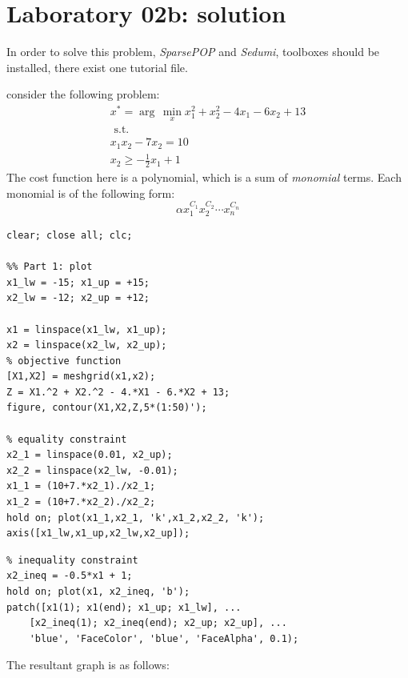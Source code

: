 \chapter{Laboratory 02b: solution}
\begin{QandAbox}
In order to solve this problem, \textit{SparsePOP} and \textit{Sedumi}, toolboxes should be installed, there exist one tutorial file.
\end{QandAbox}
consider the following problem:
\[
\begin{array}{c}
x^* = \arg\,\min\limits_{x} x_1^2 + x_2^2 - 4x_1 - 6x_2 + 13\\
\text{ s.t. }\\[1em]
x_1x_2 - 7x_2 = 10\\ [1em]
x_2 \geq -\frac{1}{2}x_1 +1
\end{array}
\]
The cost function here is a polynomial, which is a sum of \textit{monomial} terms. Each monomial is of the following form:
\[
\alpha x_1^{C_1} x_2^{C_2} \cdots x_n^{C_n}
\]

\begin{example}
\begin{lstlisting}
clear; close all; clc;

%% Part 1: plot
x1_lw = -15; x1_up = +15;
x2_lw = -12; x2_up = +12;

x1 = linspace(x1_lw, x1_up);
x2 = linspace(x2_lw, x2_up);
% objective function
[X1,X2] = meshgrid(x1,x2);
Z = X1.^2 + X2.^2 - 4.*X1 - 6.*X2 + 13;
figure, contour(X1,X2,Z,5*(1:50)');

% equality constraint
x2_1 = linspace(0.01, x2_up);
x2_2 = linspace(x2_lw, -0.01);
x1_1 = (10+7.*x2_1)./x2_1;
x1_2 = (10+7.*x2_2)./x2_2;
hold on; plot(x1_1,x2_1, 'k',x1_2,x2_2, 'k');
axis([x1_lw,x1_up,x2_lw,x2_up]);
\end{lstlisting}
\end{example}


\begin{example}
\begin{lstlisting}
% inequality constraint
x2_ineq = -0.5*x1 + 1;
hold on; plot(x1, x2_ineq, 'b');
patch([x1(1); x1(end); x1_up; x1_lw], ...
    [x2_ineq(1); x2_ineq(end); x2_up; x2_up], ...
    'blue', 'FaceColor', 'blue', 'FaceAlpha', 0.1);
\end{lstlisting}
\end{example}
The resultant graph is as follows:

